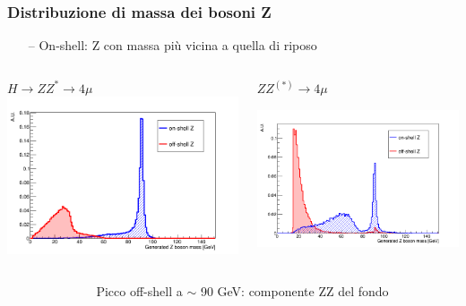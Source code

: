 \documentclass{beamer}
\begin{document}
\begin{frame}[t]
\frametitle{Distribuzione di massa dei bosoni Z}

\begin{itemize}
\item[\color{black}--] On-shell: Z con massa pi\`u vicina a quella di riposo
\end{itemize}
\bigskip
\begin{columns}
\begin{column}{.5\textwidth}
\centering
$H \rightarrow ZZ^* \rightarrow 4\mu$
\includegraphics[width=\textwidth]{HZZ4mu/genZMass}
\end{column}
\begin{column}{.5\textwidth}
\centering
$ZZ^{(*)} \rightarrow 4\mu$\par
\includegraphics[width=\textwidth]{ZZ4mu/genZMass}
\end{column}
\end{columns}

\begin{columns}
\begin{column}{.6\textwidth}
\end{column}
\begin{column}{.4\textwidth}
Picco {\color{dred} off-shell} a $\sim$ 90 GeV: componente ZZ del fondo
\end{column}
\end{columns}

\end{frame}
\end{document}
